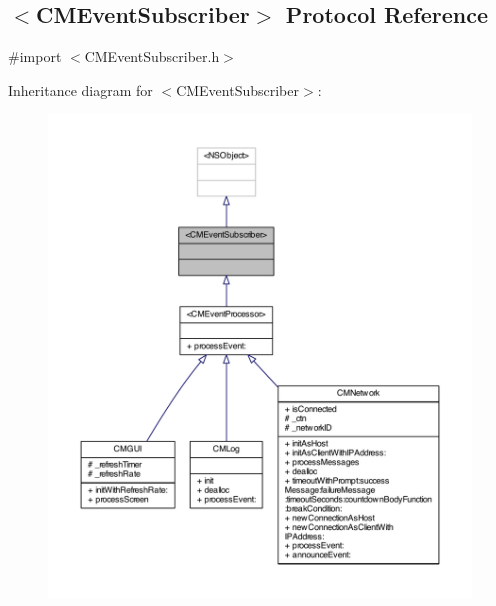 \subsection{$<$C\-M\-Event\-Subscriber$>$ Protocol Reference}
\label{protocol_c_m_event_subscriber-p}


{\ttfamily \#import $<$C\-M\-Event\-Subscriber.\-h$>$}



Inheritance diagram for $<$C\-M\-Event\-Subscriber$>$\-:
\nopagebreak
\begin{figure}[H]
\begin{center}
\leavevmode
\includegraphics[width=350pt]{protocol_c_m_event_subscriber-p__inherit__graph}
\end{center}
\end{figure}


